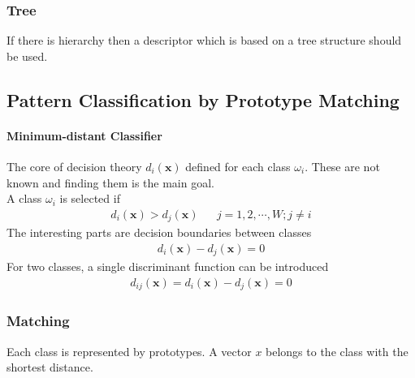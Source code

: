 \subsubsection{Tree}
If there is hierarchy then a descriptor which is based on a tree structure
should be used.

\subsection{Pattern Classification by Prototype Matching}
\paragraph{Minimum-distant Classifier}
The core of decision theory $d_i(\mathbf{x})$ defined for each class $\omega_i$.
These are not known and finding them is the main goal. \\

A class $\omega_i$ is selected if
\begin{align*}
d_i(\mathbf{x}) > d_j(\mathbf{x}) && j=1,2, \cdots, W; j \neq i
\end{align*}
The interesting parts are decision boundaries between classes
\begin{align*}
	d_i(\mathbf{x}) - d_j(\mathbf{x}) = 0
\end{align*}
For two classes, a single discriminant function can be introduced
\begin{align*}
	d_{ij}(\mathbf{x}) = d_i(\mathbf{x}) - d_j(\mathbf{x}) = 0
\end{align*}

\subsubsection{Matching}
Each class is represented by prototypes.
A vector $x$ belongs to the class with the shortest distance.


